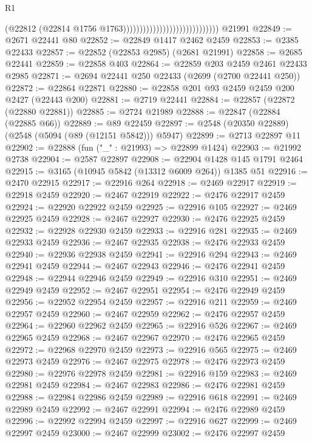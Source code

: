 \begin{lexlean}{R1}
\begin{coremodule}
                                                          (@22812
                                                            (@22814
                                                              @1756
                                                              @1763)))))))))))))))))))))))))))))
    @21991
@22849 := @2671 @22441 @80
@22852 := @22849 @1417 @2462 @2459
@22853 := @2385 @22433
@22857 := @22852 (@22853 @2985) (@2681 @21991)
@22858 := @2685 @22441
@22859 := @22858 @403
@22864 := @22859 @203 @2459 @2461 @22433 @2985
@22871 := @2694 @22441 @250 @22433 (@2699 (@2700 @22441 @250))
@22872 := @22864 @22871
@22880 := @22858 @201 @93 @2459 @2459 @200 @2427 (@22443 @200)
@22881 := @2719 @22441
@22884 := @22857 (@22872 (@22880 @22881))
@22885 := @2724 @21989
@22888 := @22847 (@22884 (@22885 @66))
@22889 := @89 @22459
@22897 := @2548 (@20350 @22889) (@2548 (@5094 (@89 (@12151 @5842))) @5947)
@22899 := @2713 @22897 @11
@22902 := @22888 (fun ("_" : @21993) => @22899 @1424)
@22903 := @21992 @2738
@22904 := @2587 @22897
@22908 := @22904 @1428 @145 @1791 @2464
@22915 := @3165 (@10945 @5842 (@13312 @6009 @264)) @1385 @51
@22916 := @2470 @22915
@22917 := @22916 @264
@22918 := @2469 @22917
@22919 := @22918 @2459
@22920 := @2467 @22919
@22922 := @2476 @22917 @2459
@22924 := @22920 @22922 @2459
@22925 := @22916 @105
@22927 := @2469 @22925 @2459
@22928 := @2467 @22927
@22930 := @2476 @22925 @2459
@22932 := @22928 @22930 @2459
@22933 := @22916 @281
@22935 := @2469 @22933 @2459
@22936 := @2467 @22935
@22938 := @2476 @22933 @2459
@22940 := @22936 @22938 @2459
@22941 := @22916 @294
@22943 := @2469 @22941 @2459
@22944 := @2467 @22943
@22946 := @2476 @22941 @2459
@22948 := @22944 @22946 @2459
@22949 := @22916 @310
@22951 := @2469 @22949 @2459
@22952 := @2467 @22951
@22954 := @2476 @22949 @2459
@22956 := @22952 @22954 @2459
@22957 := @22916 @211
@22959 := @2469 @22957 @2459
@22960 := @2467 @22959
@22962 := @2476 @22957 @2459
@22964 := @22960 @22962 @2459
@22965 := @22916 @526
@22967 := @2469 @22965 @2459
@22968 := @2467 @22967
@22970 := @2476 @22965 @2459
@22972 := @22968 @22970 @2459
@22973 := @22916 @565
@22975 := @2469 @22973 @2459
@22976 := @2467 @22975
@22978 := @2476 @22973 @2459
@22980 := @22976 @22978 @2459
@22981 := @22916 @159
@22983 := @2469 @22981 @2459
@22984 := @2467 @22983
@22986 := @2476 @22981 @2459
@22988 := @22984 @22986 @2459
@22989 := @22916 @618
@22991 := @2469 @22989 @2459
@22992 := @2467 @22991
@22994 := @2476 @22989 @2459
@22996 := @22992 @22994 @2459
@22997 := @22916 @627
@22999 := @2469 @22997 @2459
@23000 := @2467 @22999
@23002 := @2476 @22997 @2459

\end{coremodule}
\end{lexlean}
